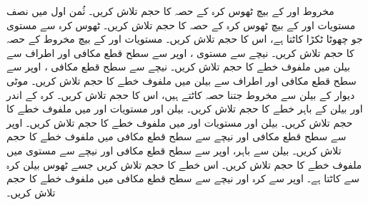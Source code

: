 مخروط  اور  کے بیچ ٹھوس  کرہ  کے حصہ  کا حجم تلاش کریں۔
ثُمن اول میں نصف مستویات  اور  کے بیچ  ٹھوس کرہ    کے حصہ کا حجم تلاش کریں۔
ٹھوس کرہ  سے مستوی  جو چھوٹا ٹکڑا کاٹتا ہے، اس کا حجم تلاش کریں۔
مستویات  اور  کے بیچ مخروط  کے حصہ کا حجم تلاش کریں۔
نیچے سے مستوی ، اوپر سے سطح قطع مکافی  اور اطراف سے بیلن  میں ملفوف خطے کا حجم تلاش کریں۔
نیچے سے سطح قطع مکافی  ، اوپر سے سطح قطع مکافی  اور اطراف سے بیلن  میں ملفوف خطے کا حجم تلاش کریں۔
موٹی  دیوار کے بیلن   سے مخروط   جتنا حصہ کاٹتے ہیں، اس کا حجم تلاش کریں۔
کرہ  کے اندر اور بیلن  کے باہر خطے کا حجم تلاش کریں۔
بیلن  اور مستویات  اور  میں ملفوف خطے کا حجم تلاش کریں۔
بیلن  اور مستویات  اور  میں ملفوف خطے کا حجم تلاش کریں۔
اوپر سے سطح قطع مکافی  اور نیچے سے سطح قطع مکافی  میں ملفوف خطے کا حجم تلاش کریں۔
 بیلن  سے باہر،  اوپر سے سطح قطع مکافی  اور  نیچے سے مستوی  میں ملفوف    خطے  کا حجم تلاش کریں۔
اس خطے کا حجم تلاش کریں جسے ٹھوس بیلن   کرہ  سے کاٹتا ہے۔
اوپر سے کرہ  اور نیچے سے سطح قطع مکافی  میں ملفوف خطے کا حجم تلاش کریں۔

